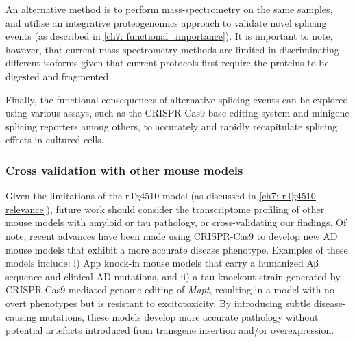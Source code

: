 An alternative method is to perform mass-spectrometry on the same samples, and utilise an integrative proteogenomics approach to validate novel splicing events (as described in \cref{ch7: functional_importance}). It is important to note, however, that current mass-spectrometry methods are limited in discriminating different isoforms given that current protocols first require the proteins to be digested and fragmented. 

Finally, the functional consequences of alternative splicing events can be explored using various assays, such as the CRISPR-Cas9 base-editing system and minigene splicing reporters among others, to accurately and rapidly recapitulate splicing effects in cultured cells.  


\subsubsection{Cross validation with other mouse models}  
\label{ch7: cross-validation_mouse_models}
Given the limitations of the rTg4510 model (as discussed in \cref{ch7: rTg4510 relevance}), future work should consider the transcriptome profiling of other mouse models with amyloid or tau pathology, or cross-validating our findings. Of note, recent advances have been made using CRISPR-Cas9 to develop new AD mouse models that exhibit a more accurate disease phenotype. Examples of these models include: i) App knock-in mouse models that carry a humanized Aβ sequence and clinical AD mutations\cite{Nagata2018, Serneels2020}, and ii) a tau knockout strain generated by CRISPR-Cas9-mediated genome editing of \textit{Mapt}, resulting in a model with no overt phenotypes but is resistant to excitotoxicity\cite{Tan2018}. By introducing subtle disease-causing mutations, these models develop more accurate pathology without potential artefacts introduced from transgene insertion and/or overexpression.


